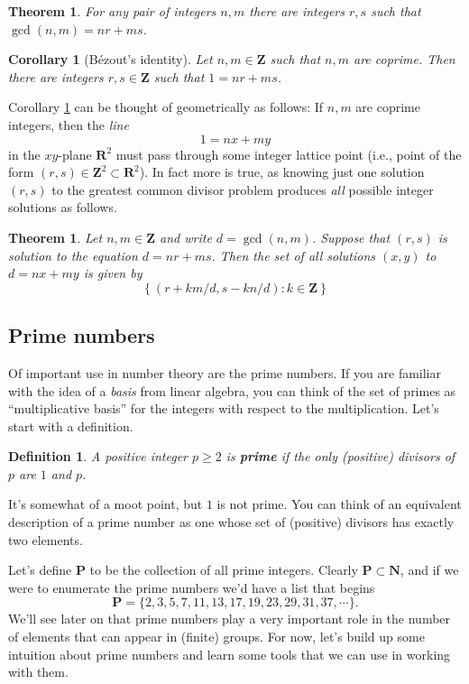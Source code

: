 \documentclass[12pt]{article}
\numberwithin{equation}{subsection}
\newtheorem{thm}[subsection]{Theorem}
\newtheorem{defn}[subsection]{Definition}
\newtheorem{corollary}[subsection]{Corollary}
\theoremstyle{note}
\begin{document}
\begin{thm}\label{gcd-exists}
	For any pair of integers $n,m$ there are integers $r,s$ such that $\gcd(n,m)=nr+ms$.
\end{thm}

\begin{corollary}[B\'ezout's identity] \label{bez}
	Let $n,m\in\mathbf{Z}$ such that $n,m$ are coprime. Then there are integers $r,s\in\mathbf{Z}$ such that $1=nr+ms$. 
\end{corollary}

Corollary \ref{bez} can be thought of geometrically as follows: If $n,m$ are coprime integers, then the \textit{line} \[1=nx+my\] in the $xy$-plane $\mathbf{R}^2$ must pass through some integer lattice point (i.e., point of the form $(r,s)\in\mathbf{Z}^2\subset \mathbf{R}^2$). In fact more is true, as knowing just one solution $(r,s)$ to the greatest common divisor problem produces \textit{all} possible integer solutions as follows.

\begin{thm} \label{gcd-solutions}
	Let $n,m\in\mathbf{Z}$ and write $d=\gcd(n,m)$. Suppose that $(r,s)$ is solution to the equation $d=nr+ms$. Then the set of all solutions $(x,y)$ to $d=nx+my$ is given by \[ \left\{ (r+km/d,s-kn/d) : k\in\mathbf{Z}\right\} \] 
\end{thm}

\subsection{Prime numbers}
Of important use in number theory are the prime numbers. If you are familiar with the idea of a \textit{basis} from linear algebra, you can think of the set of primes as ``multiplicative basis'' for the integers with respect to the multiplication. Let's start with a definition.


\begin{defn}
	A positive integer $p\geq 2$ is \textbf{prime} if the only (positive) divisors of $p$ are $1$ and $p$. \end{defn}
It's somewhat of a moot point, but $1$ is not prime. You can think of an equivalent description of a prime number as one whose set of (positive) divisors has exactly two elements. 

Let's define $\mathbf{P}$ to be the collection of all prime integers. Clearly $\mathbf{P}\subset \mathbf{N}$, and if we were to enumerate the prime numbers we'd have a list that begins \[ \mathbf{P}=\{ 2,3,5,7,11,13,17,19,23,29,31,37,\cdots \}. \]
We'll see later on that prime numbers play a very important role in the number of elements that can appear in (finite) groups. For now, let's build up some intuition about prime numbers and learn some tools that we can use in working with them. 
\end{document}
